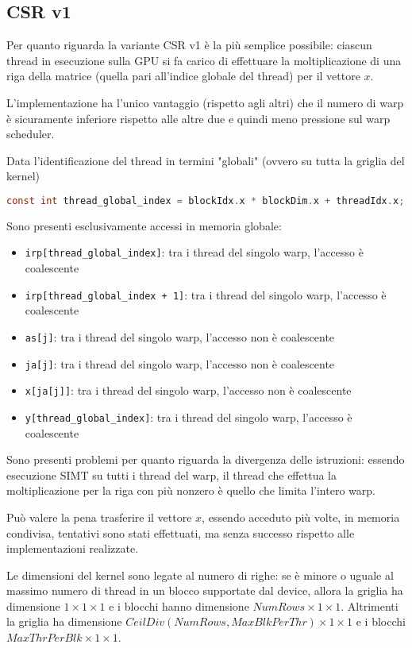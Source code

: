 \documentclass[a4paper,9pt]{extarticle}
\begin{document}
\subsection{CSR v1}
Per quanto riguarda la variante CSR v1 è la più semplice possibile: ciascun thread in esecuzione sulla GPU si fa carico
di effettuare la moltiplicazione di una riga della matrice (quella pari all'indice globale del thread) per il vettore
$x$.

L'implementazione ha l'unico vantaggio (rispetto agli altri)
che il numero di warp è sicuramente inferiore rispetto alle altre due e quindi meno pressione sul warp scheduler.

Data l'identificazione del thread in termini "globali" (ovvero su tutta la griglia del kernel)
\begin{lstlisting}[language=C]
const int thread_global_index = blockIdx.x * blockDim.x + threadIdx.x;
\end{lstlisting}

Sono presenti esclusivamente accessi in memoria globale:
\begin{itemize}
	\item \texttt{irp[thread\_global\_index]}: tra i thread del singolo warp, l'accesso è coalescente
	\item \texttt{irp[thread\_global\_index + 1]}: tra i thread del singolo warp, l'accesso è coalescente
	\item \texttt{as[j]}: tra i thread del singolo warp, l'accesso non è coalescente
	\item \texttt{ja[j]}: tra i thread del singolo warp, l'accesso non è coalescente
	\item \texttt{x[ja[j]]}: tra i thread del singolo warp, l'accesso non è coalescente
	\item \texttt{y[thread\_global\_index]}: tra i thread del singolo warp, l'accesso è coalescente
\end{itemize}

Sono presenti problemi per quanto riguarda la divergenza delle istruzioni: essendo esecuzione SIMT su tutti i thread del
warp, il thread che effettua la moltiplicazione per la riga con più nonzero è quello che limita l'intero warp.

Può valere la pena trasferire il vettore $x$, essendo acceduto più volte, in memoria condivisa, tentativi sono stati
effettuati, ma senza successo rispetto alle implementazioni realizzate.

Le dimensioni del kernel sono legate al numero di righe: se è minore o uguale al massimo numero di thread in un blocco
supportate dal device, allora la griglia ha dimensione $1\times1\times1$ e i blocchi hanno dimensione 
$NumRows\times1\times1$. Altrimenti la griglia ha dimensione $CeilDiv(NumRows,MaxBlkPerThr)\times1\times1$ e i blocchi
$MaxThrPerBlk\times1\times1$. 
\end{document}
